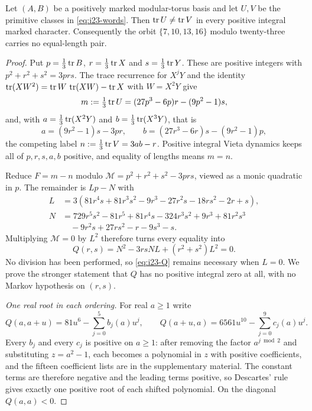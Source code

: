 \begin{proposition}
\label{prop:intersection-twentythree}
Let $(A,B)$ be a positively marked modular-torus basis and let $U,V$ be
the primitive classes in \eqref{eq:i23-words}. Then $\operatorname{tr} U\ne\operatorname{tr} V$ in
every positive integral marked character. Consequently the orbit
$\{7,10,13,16\}$ modulo twenty-three carries no equal-length pair.
\end{proposition}

\begin{proof}
Put $p=\tfrac13\operatorname{tr} B$, $r=\tfrac13\operatorname{tr} X$ and $s=\tfrac13\operatorname{tr} Y$. These are
positive integers with $p^2+r^2+s^2=3prs$. The trace recurrence for
$X^jY$ and the identity $\operatorname{tr}(XW^2)=\operatorname{tr} W\,\operatorname{tr}(XW)-\operatorname{tr} X$ with $W=X^2Y$
give
\begin{equation}
 m:=\tfrac13\operatorname{tr} U=(27p^3-6p)r-(9p^2-1)s,
 \label{eq:i23-m}
\end{equation}
and, with $a=\tfrac13\operatorname{tr}(X^2Y)$ and $b=\tfrac13\operatorname{tr}(X^3Y)$, that is
$$
 a=(9r^2-1)s-3pr,\qquad
 b=(27r^3-6r)s-(9r^2-1)p,
$$
the competing label $n:=\tfrac13\operatorname{tr} V=3ab-r$. Positive integral Vieta
dynamics keeps all of $p,r,s,a,b$ positive, and equality of lengths means
$m=n$.

Reduce $F=m-n$ modulo $\mathcal M=p^2+r^2+s^2-3prs$, viewed as a monic
quadratic in $p$. The remainder is $Lp-N$ with
\begin{align*}
 L&=3(81r^4s+81r^3s^2-9r^3-27r^2s-18rs^2-2r+s),\\
 N&=729r^5s^2-81r^5+81r^4s-324r^3s^2+9r^3+81r^2s^3\\
 &\quad-9r^2s+27rs^2-r-9s^3-s.
\end{align*}
Multiplying $\mathcal M=0$ by $L^2$ therefore turns every equality into
\begin{equation}
 Q(r,s)=N^2-3rsNL+(r^2+s^2)L^2=0 .
 \label{eq:i23-Q}
\end{equation}
No division has been performed, so \eqref{eq:i23-Q} remains necessary when
$L=0$. We prove the stronger statement that $Q$ has no positive integral
zero at all, with no Markov hypothesis on $(r,s)$.

\smallskip\noindent\emph{One real root in each ordering.}
For real $a\geqslant1$ write
$$
 Q(a,a+u)=81u^6-\sum_{j=0}^{5}b_j(a)u^j,\qquad
 Q(a+u,a)=6561u^{10}-\sum_{j=0}^{9}c_j(a)u^j .
$$
Every $b_j$ and every $c_j$ is positive on $a\geqslant1$: after removing
the factor $a^{j\bmod2}$ and substituting $z=a^2-1$, each becomes a
polynomial in $z$ with positive coefficients, and the fifteen coefficient
lists are in the supplementary material. The constant terms are therefore
negative and the leading terms positive, so Descartes' rule gives exactly
one positive root of each shifted polynomial. On the diagonal
$Q(a,a)<0$.


\end{proof}
